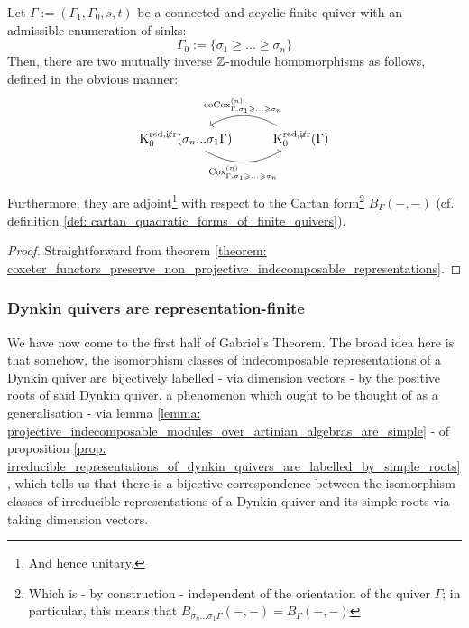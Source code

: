             \begin{corollary} \label{coro: coxeter_functors_and_grothendieck_groups}
                Let $\Gamma := (\Gamma_1, \Gamma_0, s, t)$ be a connected and acyclic finite quiver with an admissible enumeration of sinks:
                    $$\Gamma_0 := \{\sigma_1 \geq ... \geq \sigma_n\}$$
                Then, there are two mutually inverse $\mathbb{Z}$-module homomorphisms as follows, defined in the obvious manner:
                    $$
                        \begin{tikzcd}
                        	{\K_0^{\red, \not \irr}(\sigma_n ... \sigma_1 \Gamma)} & {\K_0^{\red, \not \irr}(\Gamma)}
                        	\arrow[""{name=0, anchor=center, inner sep=0}, "{\Cox_{\Gamma, \sigma_1 \geq ...\geq \sigma_n}^{(n)}}"', bend right, from=1-1, to=1-2]
                        	\arrow[""{name=1, anchor=center, inner sep=0}, "{\co\Cox_{\Gamma, \sigma_1 \geq ...\geq \sigma_n}^{(n)}}"', bend right, from=1-2, to=1-1]
                        \end{tikzcd}
                    $$
                Furthermore, they are adjoint\footnote{And hence unitary.} with respect to the Cartan form\footnote{Which is - by construction - independent of the orientation of the quiver $\Gamma$; in particular, this means that $B_{\sigma_n ... \sigma_1 \Gamma}(-, -) = B_{\Gamma}(-, -)$} $B_{\Gamma}(-, -)$ (cf. definition \ref{def: cartan_quadratic_forms_of_finite_quivers}).
            \end{corollary}
                \begin{proof}
                    Straightforward from theorem \ref{theorem: coxeter_functors_preserve_non_projective_indecomposable_representations}. 
                \end{proof}
            
        \subsubsection{Dynkin quivers are representation-finite}
            We have now come to the first half of Gabriel's Theorem. The broad idea here is that somehow, the isomorphism classes of indecomposable representations of a Dynkin quiver are bijectively labelled - via dimension vectors - by the positive roots of said Dynkin quiver, a phenomenon which ought to be thought of as a generalisation - via lemma \ref{lemma: projective_indecomposable_modules_over_artinian_algebras_are_simple} - of proposition \ref{prop: irreducible_representations_of_dynkin_quivers_are_labelled_by_simple_roots}, which tells us that there is a bijective correspondence between the isomorphism classes of irreducible representations of a Dynkin quiver and its simple roots via taking dimension vectors. 
            
